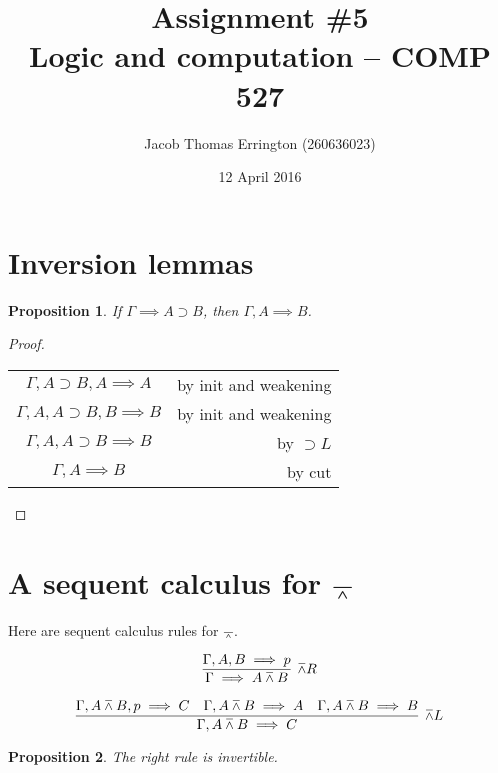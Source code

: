 \documentclass[letterpaper,11pt]{article}
\author{Jacob Thomas Errington (260636023)}
\title{Assignment \#5\\Logic and computation -- COMP 527}
\date{12 April 2016}
\newtheorem{prop}{Proposition}
\newcommand{\seq}{\implies}
\newcommand{\imp}{\supset}
\newcommand{\nand}{\barwedge}
\begin{document}
\maketitle

\section{Inversion lemmas}

\begin{prop}
    If $\Gamma \seq A \imp B$, then $\Gamma, A \seq B$.
\end{prop}

\begin{proof} ~


    \begin{center}
        \begin{tabular}{c r}
            $\Gamma, A \imp B, A \seq A$
            &
            by init and weakening \\
            $\Gamma, A, A \imp B, B \seq B$
            &
            by init and weakening \\
            $\Gamma, A, A \imp B \seq B$
            &
            by $\imp L$ \\
            $\Gamma, A \seq B$
            &
            by cut
        \end{tabular}
    \end{center}
\end{proof}

\section{A sequent calculus for $\nand$}

Here are sequent calculus rules for $\nand$.

\begin{equation*}
    \infer[\nand R]{\Gamma \seq A \nand B}{
        \Gamma, A, B \seq p
    }
\end{equation*}

\begin{equation*}
    \infer[\nand L]{\Gamma, A \nand B \seq C}{
        \Gamma, A \nand B, p \seq C
        &
        \Gamma, A \nand B \seq A
        &
        \Gamma, A \nand B \seq B
    }
\end{equation*}

\begin{prop}
    The right rule is invertible.
\end{prop}
\end{document}
